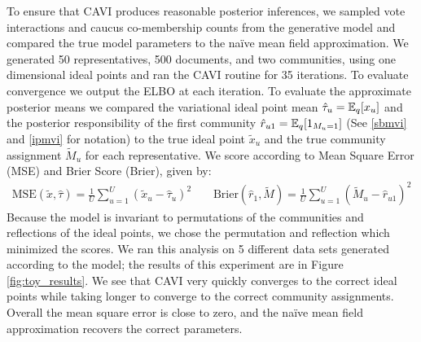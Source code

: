 \documentclass{article}
\begin{document}
To ensure that CAVI produces reasonable posterior inferences, we sampled vote interactions and caucus co-membership counts from the generative model and compared the true model parameters to the na\"ive mean field approximation. We generated 50 representatives, 500 documents, and two communities, using one dimensional ideal points and ran the CAVI routine for 35 iterations. To evaluate convergence we output the ELBO at each iteration. To evaluate the approximate posterior means we compared the variational ideal point mean $\hat{\tau}_u = \mathbb{E}_q[x_u]$ and the posterior responsibility of the first community $\hat{r}_{u1} = \mathbb{E}_q[1_{M_u = 1}]$ (See \ref{sbmvi} and \ref{ipmvi} for notation) to the true ideal point $\widetilde{x}_u$ and the true community assignment $\widetilde{M}_u$ for each representative. We score according to Mean Square Error (MSE) and Brier Score (Brier), given by:
\begin{align*}
 \text{MSE}(\widetilde{x}, \hat{\tau}) = \frac{1}{U} \sum_{u=1}^U (\widetilde{x}_u - \hat{\tau}_u) ^2  \;\; & \;\; \text{Brier}(\hat{r}_1, \widetilde{M}) = \frac{1}{U} \sum_{u=1}^U (\widetilde{M}_u - \hat{r}_{u1})^2
\end{align*}
Because the model is invariant to permutations of the communities and reflections of the ideal points, we chose the permutation and reflection which minimized the scores. We ran this analysis on 5 different data sets generated according to the model; the results of this experiment are in Figure \ref{fig:toy_results}. We see that CAVI very quickly converges to the correct ideal points while taking longer to converge to the correct community assignments. Overall the mean square error is close to zero, and the na\"ive mean field approximation recovers the correct parameters.
\end{document}
